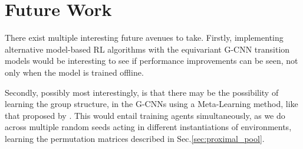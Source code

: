 \section{Future Work}
There exist multiple interesting future avenues to take. Firstly, implementing alternative model-based RL algorithms with the equivariant G-CNN transition models would be interesting to see if performance improvements can be seen, not only when the model is trained offline.

Secondly, possibly most interestingly, is that there may be the possibility of learning the group structure, in the G-CNNs using a Meta-Learning method, like that proposed by \cite{zhou2020meta}. This would entail training agents simultaneously, as we do across multiple random seeds acting in different instantiations of environments, learning the permutation matrices described in Sec.\ref{sec:proximal_pool}.

